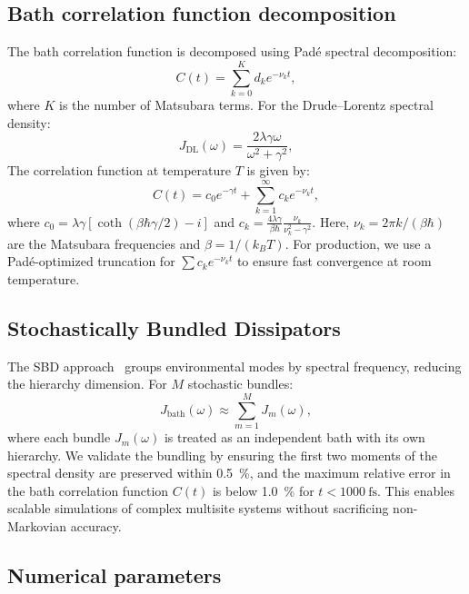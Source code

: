 \documentclass[11pt,a4paper]{article}
\begin{document}
\subsection{Bath correlation function decomposition}

The bath correlation function is decomposed using Padé spectral decomposition:
\begin{equation}
C(t) = \sum_{k=0}^{K} d_k e^{-\nu_k t},
\label{eq:SI_bath_correlation}
\end{equation}
where $K$ is the number of Matsubara terms. For the Drude--Lorentz spectral density:
\begin{equation}
J_{\mathrm{DL}}(\omega) = \frac{2\lambda\gamma\omega}{\omega^2 + \gamma^2},
\label{eq:SI_drude_lorentz}
\end{equation}
The correlation function at temperature $T$ is given by:
\begin{equation}
C(t) = c_0 e^{-\gamma t} + \sum_{k=1}^{\infty} c_k e^{-\nu_k t},
\label{eq:SI_correlation_DL}
\end{equation}
where $c_0 = \lambda\gamma[\coth(\beta\hbar\gamma/2) - i]$ and $c_k = \frac{4\lambda\gamma}{\beta\hbar} \frac{\nu_k}{\nu_k^2 - \gamma^2}$. Here, $\nu_k = 2\pi k/(\beta\hbar)$ are the Matsubara frequencies and $\beta = 1/(k_B T)$. For production, we use a Padé-optimized truncation for $\sum c_k e^{-\nu_k t}$ to ensure fast convergence at room temperature.

\subsection{Stochastically Bundled Dissipators}

The SBD approach~\cite{Varvelo2021} groups environmental modes by spectral frequency, reducing the hierarchy dimension. For $M$ stochastic bundles:
\begin{equation}
J_{\mathrm{bath}}(\omega) \approx \sum_{m=1}^{M} J_m(\omega),
\label{eq:SI_sbd}
\end{equation}
where each bundle $J_m(\omega)$ is treated as an independent bath with its own hierarchy. We validate the bundling by ensuring the first two moments of the spectral density are preserved within \SI{0.5}{\percent}, and the maximum relative error in the bath correlation function $C(t)$ is below \SI{1.0}{\percent} for $t < \SI{1000}{\femto\second}$. This enables scalable simulations of complex multisite systems without sacrificing non-Markovian accuracy.

\subsection{Numerical parameters}
\end{document}
